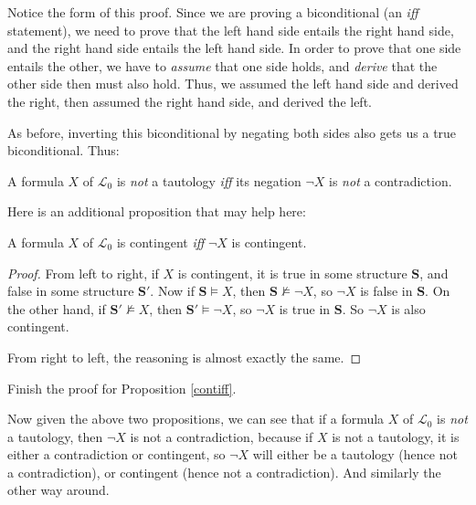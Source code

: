 \begin{remark}
Notice the form of this proof. Since we are proving a biconditional (an \textit{iff} statement), we need to prove that the left hand side entails the right hand side, and the right hand side entails the left hand side. In order to prove that one side entails the other, we have to \textit{assume} that one side holds, and \textit{derive} that the other side then must also hold. Thus, we assumed the left hand side and derived the right, then assumed the right hand side, and derived the left. 
\end{remark}

As before, inverting this biconditional by negating both sides also gets us a true biconditional. Thus:

\begin{prop}
A formula $X$ of $\mathcal{L}_0$ is \emph{not} a tautology \textit{iff} its negation $\neg X$ is \emph{not} a contradiction. 
\end{prop}

Here is an additional proposition that may help here:

\begin{prop}
A formula $X$ of $\mathcal{L}_0$ is contingent \textit{iff} $\neg X$ is contingent. \label{contiff}
\end{prop}

\begin{proof}
From left to right, if $X$ is contingent, it is true in some structure $\mathbf{S}$, and false in some structure $\mathbf{S}'$. Now if $\mathbf{S} \models X$, then $\mathbf{S} \not\models \neg X$, so $\neg X$ is false in $\mathbf{S}$. On the other hand, if $\mathbf{S}' \not\models X$, then $\mathbf{S}' \models \neg X$, so $\neg X$ is true in $\mathbf{S}$. So $\neg X$ is also contingent. 

From right to left, the reasoning is almost exactly the same. 
\end{proof}

\begin{exc}
Finish the proof for Proposition \ref{contiff}. 
\end{exc}

Now given the above two propositions, we can see that if a formula $X$ of $\mathcal{L}_0$ is \textit{not} a tautology, then $\neg X$ is not a contradiction, because if $X$ is not a tautology, it is either a contradiction or contingent, so $\neg X$ will either be a tautology (hence not a contradiction), or contingent (hence not a contradiction). And similarly the other way around. 

